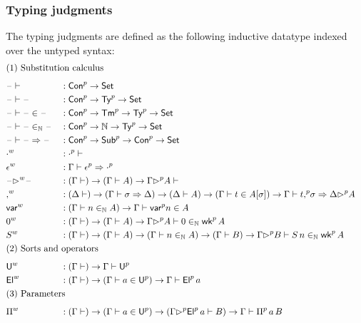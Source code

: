   \subsubsection{Typing judgments}
  The typing judgments are defined as the following inductive datatype indexed over the
  untyped syntax:
\begin{alignat*}{5}
  & \rlap{(1) Substitution calculus} \\[0.5em]
  & \blank \vdash && : \Conu\ra \Set \\
  & \blank \vdash \blank  && : \Conu\ra \Tyu\ra\Set \\
  & \blank \vdash \blank \in \blank  && : \Conu\ra \Tmu\ra \Tyu\ra \Set \\
  & \blank \vdash \blank \invar \blank  && : \Conu\ra \N \ra \Tyu\ra \Set \\
  & \blank \vdash \blank \Rightarrow \blank  && : \Conu\ra \Subu \ra \Conu\ra \Set \\
  & \emptyw && : \emptyu \vdash \\
  & \epsilonw && : \Gamma\vdash \epsilonu \Rightarrow \emptyu \\
  & \blank\extw\blank && : ( \Gamma\vdash )  \ra  (\Gamma\vdash A)  \ra
  \Gamma\extu A \vdash \\
  & \consw && :
    (\Delta \vdash) \ra
    (\Gamma\vdash \sigma \Rightarrow\Delta)\ra
    ( \Delta \vdash A) \ra
    ( \Gamma \vdash t \in A[\sigma]) \ra
    \Gamma \vdash t \consu \sigma \Rightarrow \Delta\extu A
   \\
  & \varw  && : (\Gamma \vdash n \invar A) \ra \Gamma \vdash \varu n \in A \\
  & \vzw  && : (\Gamma\vdash)\ra(\Gamma\vdash A)\ra\Gamma \extu  A \vdash 0 \invar \wku \, A \\
  & \vsw  && : (\Gamma\vdash)\ra(\Gamma\vdash A)\ra(\Gamma \vdash n \invar A) \ra (\Gamma \vdash B) \ra \Gamma \extu  B
  \vdash S\,n \invar \wku \, A \\
  & \rlap{(2) Sorts and operators} \\[0.5em]
  & \Uw && : (\Gamma \vdash)\ra \Gamma \vdash \Uu \\
  & \Elw && : (\Gamma \vdash)\ra (\Gamma \vdash a \in \Uu)\ra\Gamma \vdash \Elu\,a \\
  & \rlap{(3) Parameters} \\[0.5em]
  & \Piw && :
    (\Gamma \vdash)\ra (\Gamma \vdash a \in \Uu)\ra(\Gamma \extu
  \Elu\,a \vdash B)\ra\Gamma \vdash \Piu \, a \, B \\

\end{alignat*}
